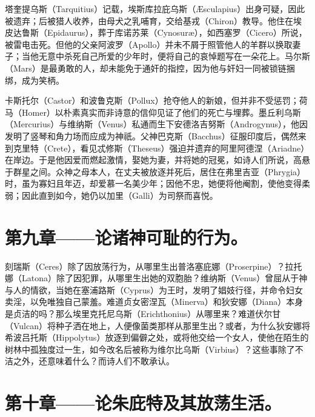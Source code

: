 塔奎提乌斯（Tarquitius）记载，埃斯库拉庇乌斯（Æsculapius）出身可疑，因此被遗弃；后被猎人收养，由母犬之乳哺育，交给基戎（Chiron）教导。他住在埃皮达鲁斯（Epidaurus），葬于库诺苏莱（Cynosuræ），如西塞罗（Cicero）所说，被雷电击死。但他的父亲阿波罗（Apollo）并未不屑于照管他人的羊群以换取妻子；当他无意中杀死自己所爱的少年时，便将自己的哀悼题写在一朵花上。马尔斯（Mars）是最勇敢的人，却未能免于通奸的指控，因为他与奸妇一同被锁链捆绑，成为笑柄。\par

卡斯托尔（Castor）和波鲁克斯（Pollux）抢夺他人的新娘，但并非不受惩罚；荷马（Homer）以朴素真实而非诗意的信仰见证了他们的死亡与埋葬。墨丘利乌斯（Mercurius）与维纳斯（Venus）私通而生下安德洛吉努斯（Androgynus），他因发明了竖琴和角力场而应成为神祇。父神巴克斯（Bacchus）征服印度后，偶然来到克里特（Crete），看见忒修斯（Theseus）强迫并遗弃的阿里阿德涅（Ariadne）在岸边。于是他因爱而燃起激情，娶她为妻，并将她的冠冕，如诗人们所说，高悬于群星之间。众神之母本人，在丈夫被放逐并死后，居住在弗里吉亚（Phrygia）时，虽为寡妇且年迈，却爱慕一名美少年；因他不忠，她便将他阉割，使他变得柔弱；因此直到如今，她仍以加里（Galli）为司祭而喜悦。\par


\section{第九章——论诸神可耻的行为。}

刻瑞斯（Ceres）除了因放荡行为，从哪里生出普洛塞庇娜（Proserpine）？拉托娜（Latona）除了因犯罪，从哪里生出她的双胞胎？维纳斯（Venus）曾屈从于神与人的情欲，当她在塞浦路斯（Cyprus）为王时，发明了娼妓行径，并命令妇女卖淫，以免唯独自己蒙羞。难道贞女密涅瓦（Minerva）和狄安娜（Diana）本身是贞洁的吗？那么埃里克托尼乌斯（Erichthonius）从哪里来？难道伏尔甘（Vulcan）将种子洒在地上，人便像菌类那样从那里生出？或者，为什么狄安娜将希波吕托斯（Hippolytus）放逐到偏僻之处，或将他交给一个女人，使他在陌生的树林中孤独度过一生，如今改名后被称为维尔比乌斯（Virbius）？这些事除了不洁之外，还意味着什么？而诗人们不敢承认。\par


\section{第十章——论朱庇特及其放荡生活。}

